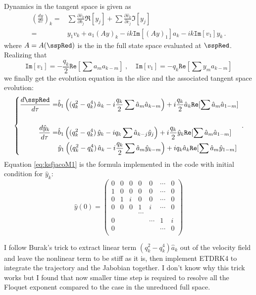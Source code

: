 Dynamics in the tangent space is given as
\begin{align*}
  (\frac{dy}{d\tau})_k
  = & \sum \frac{\partial \hat{v}_k}{\partial b_j} \Re[y_{j}]
      + \sum \frac{\partial \hat{v}_k}{\partial c_j} \Im[y_{j}] \\
  = & y_1 v_k + a_1 (Ay)_k - ik\mathtt{Im}[(Ay)_1]a_k - ik\mathtt{Im}[v_1]y_k
      \,.
\end{align*}
where $A=A(\sspRed)$ is the {\stabmat} in the full state space
evaluated at $\sspRed$. Realizing that
\[
\mathtt{Im}[v_1] =  - \frac{q_k}{2} \mathtt{Re}[\sum a_m a_{k-m}]
\;,\quad
\mathtt{Im}[v_1] = -  q_k \mathtt{Re}[\sum y_m a_{k-m}]
\]
we finally get the evolution equation in the slice and the associated
tangent space evolution:
\begin{equation}
\left\{
\begin{aligned}
  \frac{d\sspRed}{d\tau} = & \hat{b}_1 \left(( q_k^2 - q_k^4 )\, \hat{a}_k
  - i \frac{q_k}{2} \sum \hat{a}_m \hat{a}_{k-m} \right) +
  i \frac{q_k}{2} \hat{a}_k \mathtt{Re}[\sum \hat{a}_m \hat{a}_{1-m}]\\
  \\
  \frac{d\hat{y}_k}{d\tau} = &
  \hat{b}_1 \left(( q_k^2 - q_k^4 )\, \hat{y}_k
  - i q_k \sum \hat{a}_{k-j} \hat{y}_j \right)
  + i \frac{q_k}{2} \hat{y}_k \mathtt{Re}[\sum \hat{a}_m \hat{a}_{1-m} ] \\
  &
  \hat{y}_1 \left(( q_k^2 - q_k^4 )\, \hat{a}_k
  - i \frac{q_k}{2} \sum \hat{a}_{m} \hat{y}_{k-m} \right)
  + i q_k \hat{a}_k \mathtt{Re}[\sum \hat{a}_m \hat{y}_{1-m} ] \\
\end{aligned}
\right.\,.
\label{eq:ksfjacoM1}
\end{equation}
Equation \eqref{eq:ksfjacoM1} is the formula implemented in the code with
initial condition for $\hat{y}_k$:
\[
  \hat{y}(0) =
  \begin{pmatrix}
    0 & 0 & 0 & 0 & 0 & \cdots & 0 \\
    1 & 0 & 0 & 0 & 0 & \cdots & 0 \\
    0 & 1 & i & 0 & 0 & \cdots & 0 \\
    0 & 0 & 0 & 1 & i & \cdots & 0 \\
    &&& \cdots & & & \\
    0 &   &   &   & \cdots & 1 & i \\
    0 &   &   &   &   & \cdots & 0 \\
  \end{pmatrix}
\]

I follow Burak's trick to extract linear term
$( q_k^2 - q_k^4 )\hat{a}_k$ out of the velocity field and
leave the nonlinear term to be stiff as it is, then implement ETDRK4 to
integrate the trajectory and the Jabobian together. I don't know why
this trick works but I found that now smaller time step is required
to resolve all the Floquet exponent compared to the case in the unreduced
full space.

